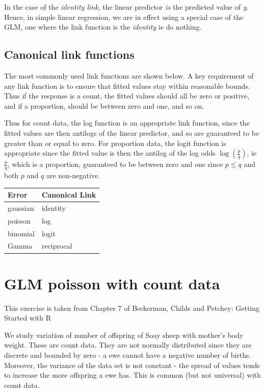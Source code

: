 \documentclass[
  letterpaper,
  DIV=11,
  numbers=noendperiod]{scrreprt}
\begin{document}
In the case of the \emph{identity link}, the linear predictor \emph{is}
the predicted value of \emph{y}. Hence, in simple linear regression, we
are in effect using a special case of the GLM, one where the link
function is the \emph{identity} ie do nothing.

\section{Canonical link functions}\label{canonical-link-functions}

The most commonly used link functions are shown below. A key requirement
of any link function is to ensure that fitted values stay within
reasonable bounds. Thus if the response is a count, the fitted values
should all be zero or positive, and if a proportion, should be between
zero and one, and so on.

Thus for count data, the log function is an appropriate link function,
since the fitted values are then antilogs of the linear predictor, and
so are guaranteed to be greater than or equal to zero. For proportion
data, the logit function is appropriate since the fitted value is then
the antilog of the log odds \(\log(\frac{p}{q})\), ie \(\frac{p}{q}\),
which is a proportion, guaranteed to be between zero and one since
\(p\leq q\) and both \(p\) and \(q\) are non-negative.

\begin{longtable}[]{@{}ll@{}}
\toprule\noalign{}
Error & Canonical Link \\
\midrule\noalign{}
\endhead
\bottomrule\noalign{}
\endlastfoot
gaussian & identity \\
poisson & log \\
binomial & logit \\
Gamma & reciprocal \\
\end{longtable}

\chapter{GLM poisson with count data}\label{glm-poisson-with-count-data}

This exercise is taken from Chapter 7 of Beckerman, Childs and Petchey:
Getting Started with R

We study variation of number of offspring of Soay sheep with mother's
body weight. These are count data. They are not normally distributed
since they are discrete and bounded by zero - a ewe cannot have a
negative number of births. Moreover, the variance of the data set is not
constant - the spread of values tends to increase the more offspring a
ewe has. This is common (but not universal) with count data.
\end{document}
